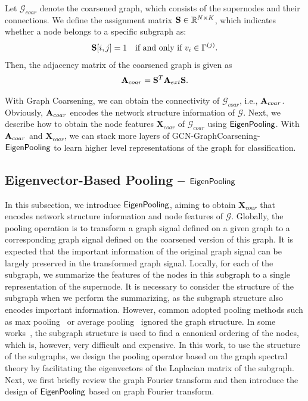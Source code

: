 \documentclass[sigconf]{acmart}
\newcommand{\pooling}{{\sf {EigenPooling}}}
\begin{document}
Let  $\mathcal{G}_{coar}$ denote the coarsened graph, which consists of the supernodes and their connections. We define the assignment matrix ${\bf S} \in \mathbb{R}^{N\times K}$, which indicates whether a node belongs to a specific subgraph as:
\begin{align*}
    {\bf S}[i,j] = 1 \quad \text{if and only if } v_i \in \Gamma^{(j)}.
\end{align*}
Then, the adjacency matrix of the coarsened graph is given as 
\begin{align}
    {\bf A}_{coar} = {\bf S}^T {\bf A}_{ext} {\bf S}. 
\end{align}

With Graph Coarsening, we can obtain the connectivity of $\mathcal{G}_{coar}$, i.e., ${\bf A}_{coar}$. Obviously, ${\bf A}_{coar}$ encodes the network structure information of $\mathcal{G}$. Next, we describe how to obtain the node features $\mathbf{X}_{coar}$ of $\mathcal{G}_{coar}$ using $\pooling$. With ${\bf A}_{coar}$ and $\mathbf{X}_{coar}$, we can stack more layers of GCN-GraphCoarsening-$\pooling$ to learn higher level representations of the graph for classification.

\subsection{Eigenvector-Based Pooling -- $\pooling$}

In this subsection, we introduce $\pooling$, aiming to obtain $\mathbf{X}_{coar}$ that encodes network structure information and node features of $\mathcal{G}$. Globally, the pooling operation is to transform a graph signal defined on a given graph to a corresponding graph signal defined on the coarsened version of this graph. It is expected that the important information of the original graph signal can be largely preserved in the transformed graph signal. Locally, for each of the subgraph, we summarize the features of the nodes in this subgraph to a single representation of the supernode. It is necessary to consider the structure of the subgraph when we perform the summarizing, as the subgraph structure also encodes important information. However, common adopted pooling methods such as max pooling~\cite{ying2018hierarchical,defferrard2016convolutional} or average pooling~\cite{duvenaud2015convolutional} ignored the graph structure. In some works~\cite{niepert2016learning}, the subgraph structure is used to find a canonical ordering of the nodes, which is, however, very difficult and expensive. In this work, to use the structure of the subgraphs, we design the pooling operator based on the graph spectral theory by facilitating the eigenvectors of the Laplacian matrix of the subgraph. Next, we first briefly review the graph Fourier transform and then introduce the design of $\pooling$ based on graph Fourier transform. 
\end{document}
